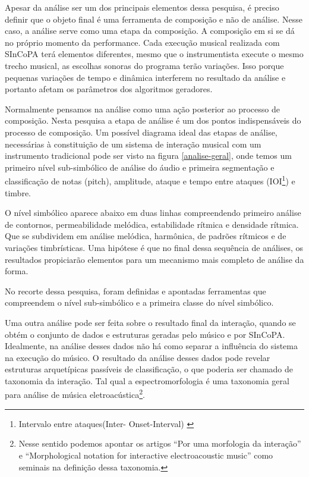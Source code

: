 \documentclass{ppgmus}
\begin{document}
Apesar da análise ser um dos principais elementos dessa pesquisa, é preciso
definir que o objeto final é uma ferramenta de composição e não de análise.
Nesse caso, a análise serve como uma etapa da composição. A composição em si
se dá no próprio momento da performance. Cada execução musical realizada
com SInCoPA terá elementos diferentes, mesmo que o instrumentista execute
o mesmo trecho musical, as escolhas sonoras do programa terão variações.
Isso porque pequenas variações de tempo e dinâmica 
interferem no resultado da análise e portanto afetam os parâmetros
dos algoritmos geradores.

Normalmente pensamos na análise
como uma ação posterior ao processo de composição. Nesta pesquisa a etapa
de análise é um dos pontos indispensáveis do processo de composição.
Um possível diagrama ideal das etapas de análise, necessárias à
constituição de um sistema de interação musical com um instrumento
tradicional pode ser visto na figura \ref{analise-geral}, onde temos um
primeiro nível sub-simbólico de análise do áudio e primeira segmentação
e classificação de notas (pitch), amplitude, ataque e tempo entre ataques (IOI\footnote{
Intervalo entre ataques(Inter-
Onset-Interval) \cite{rowe2004machine}}) e timbre.

O nível simbólico aparece abaixo em duas linhas compreendendo primeiro análise de 
contornos, permeabilidade melódica, estabilidade rítmica e densidade rítmica. 
Que se subdividem em análise melódica, harmônica, de padrões rítmicos e de 
variações timbrísticas. Uma hipótese é que no final dessa sequência de análises,
os resultados propiciarão elementos para um mecanismo mais completo de análise da
forma.



No recorte dessa pesquisa, foram definidas e apontadas ferramentas que compreendem o nível
sub-simbólico e a primeira classe do nível simbólico. 


Uma outra análise pode ser feita sobre o resultado final da interação, quando se obtém
o conjunto de dados e estruturas geradas pelo músico e por SInCoPA. Idealmente, na análise desses 
dados não há como separar
a influência do sistema na execução do músico. O resultado da análise desses dados pode revelar
estruturas arquetípicas passíveis de classificação, o que poderia ser chamado de taxonomia 
da interação. Tal qual a espectromorfologia \cite{smalley:86} é uma taxonomia geral
para análise de música eletroacústica\footnote{Nesse sentido podemos apontar os artigos
``Por uma morfologia da interação'' \cite{menezes2006musica} e ``Morphological notation for interactive electroacoustic music'' 
\cite{Patton:2007} como seminais na definição dessa taxonomia.}.
\end{document}
